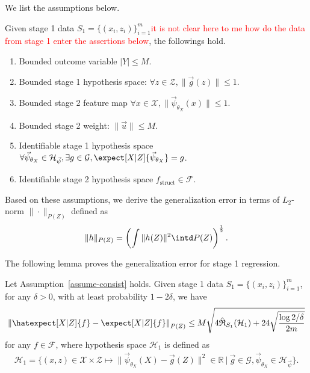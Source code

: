 We list the assumptions below.
\begin{assum} \label{assume-consist}
    Given stage 1 data $S_1 = \{(x_i, z_i)\}_{i=1}^m$\textcolor{red}{it is not clear here to me how do the data from stage 1 enter the assertions below}, the followings hold.
    \begin{enumerate}
    \item Bounded outcome variable $|Y| \leq M$.
    \item  Bounded stage 1 hypothesis space: $ \forall z \in \mathcal{Z}, \|\vec{g}(z)\| \leq 1$.
    \item Bounded stage 2 feature map $\forall x \in \mathcal{X}, \|\vec{\psi}_{\theta_X}(x) \| \leq 1 $.
    \item  Bounded stage 2 weight: $\|\vec{u}\| \leq M$.
    \item Identifiable stage 1 hypothesis space $ \forall \vec{\psi}_{\theta_X} \in \mathcal{H}_{\vec{\psi}}, \exists g\in \mathcal{G}, \expect[X|Z]{\vec{\psi}_{\theta_X}} = g$.
    \item Identifiable stage 2 hypothesis space $f_{\mathrm{struct}} \in \mathcal{F}$. 
    \end{enumerate}
\end{assum}

Based on these assumptions, we derive the generalization error in terms of $L_2$-norm $\|\cdot\|_{P(Z)}$ defined as
\begin{align*}
    \|h\|_{P(Z)} = \left(\int \|h(Z)\|^2 \intd P(Z)\right)^{\frac12}.
\end{align*}

The following lemma proves the generalization error for stage 1 regression.
\begin{lem}\label{lem:1}
    Let Assumption~\ref{assume-consist} holds. Given stage 1 data $S_1 = \{(x_i, z_i)\}_{i=1}^m$, for any $\delta>0$, with at least probability $1-2\delta$, we have
    \begin{align*}
        \left\|\hatexpect[X|Z]{f} - \expect[X|Z]{f}\right\|_{P(Z)} \leq M\sqrt{4\hat{\mathfrak{R}}_{S_1}(\mathcal{H}_1) + 24\sqrt{\frac{\log 2/\delta}{2m}}}
    \end{align*}
    for any $f \in \mathcal{F}$, where hypothesis space $\mathcal{H}_1$ is defined as
    \begin{align}
        \mathcal{H}_1 = \{(x,z) \in \mathcal{X}\times \mathcal{Z} \mapsto \|\vec{\psi}_{\theta_X}(X) - \vec{g}(Z) \|^2 \in \mathbb{R} ~|~ \vec{g} \in \mathcal{G},\vec{\psi}_{\theta_X} \in \mathcal{H}_{\vec{\psi}}\}. \label{eq:def-h1}
    \end{align}
\end{lem}


